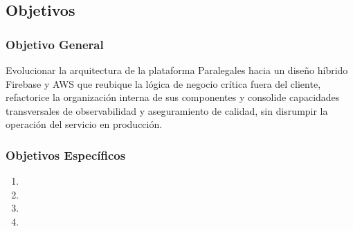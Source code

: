 \subsection{Objetivos}

\subsubsection{Objetivo General}
Evolucionar la arquitectura de la plataforma Paralegales hacia un diseño híbrido Firebase y AWS que reubique la lógica de negocio crítica fuera del cliente, refactorice la organización interna de sus componentes y consolide capacidades transversales de observabilidad y aseguramiento de calidad, sin disrumpir la operación del servicio en producción.

\subsubsection{Objetivos Específicos}

\begin{enumerate}
  \item \objetivoEspecificoA
  \item \objetivoEspecificoB
  \item \objetivoEspecificoC
  \item \objetivoEspecificoD
\end{enumerate}
